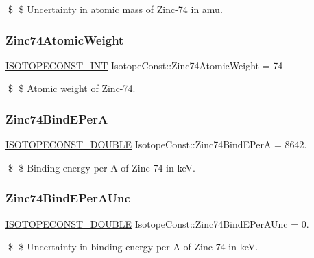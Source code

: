 \$ \$ Uncertainty in atomic mass of Zinc-\/74 in amu. \mbox{\label{group___isotope_const-_zinc-_zn74_gad34064e3c5da78dcb7d4268b9ccbb008}} 
\subsubsection{\texorpdfstring{Zinc74\+Atomic\+Weight}{Zinc74AtomicWeight}}
{\footnotesize\ttfamily \mbox{\hyperlink{group___isotope_const-_macros_ga5f18360b3e99483a35c32d789e62621c}{I\+S\+O\+T\+O\+P\+E\+C\+O\+N\+S\+T\+\_\+\+I\+NT}} Isotope\+Const\+::\+Zinc74\+Atomic\+Weight = 74}

\$ \$ Atomic weight of Zinc-\/74. \mbox{\label{group___isotope_const-_zinc-_zn74_ga9f02656f8efbcd102b7bd9b7bc5dd31a}} 
\subsubsection{\texorpdfstring{Zinc74\+Bind\+E\+PerA}{Zinc74BindEPerA}}
{\footnotesize\ttfamily \mbox{\hyperlink{group___isotope_const-_macros_ga8f45a7272ce02c0b4c65c44636ed719a}{I\+S\+O\+T\+O\+P\+E\+C\+O\+N\+S\+T\+\_\+\+D\+O\+U\+B\+LE}} Isotope\+Const\+::\+Zinc74\+Bind\+E\+PerA = 8642.}

\$ \$ Binding energy per A of Zinc-\/74 in keV. \mbox{\label{group___isotope_const-_zinc-_zn74_ga7074c37edcb4ee0ad70620c66cce2660}} 
\subsubsection{\texorpdfstring{Zinc74\+Bind\+E\+Per\+A\+Unc}{Zinc74BindEPerAUnc}}
{\footnotesize\ttfamily \mbox{\hyperlink{group___isotope_const-_macros_ga8f45a7272ce02c0b4c65c44636ed719a}{I\+S\+O\+T\+O\+P\+E\+C\+O\+N\+S\+T\+\_\+\+D\+O\+U\+B\+LE}} Isotope\+Const\+::\+Zinc74\+Bind\+E\+Per\+A\+Unc = 0.}

\$ \$ Uncertainty in binding energy per A of Zinc-\/74 in keV. \mbox{\label{group___isotope_const-_zinc-_zn74_ga049bdb1eddde636e6e1a785930d51a52}} 
